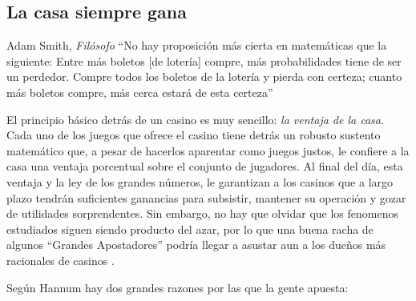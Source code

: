\subsection{La casa siempre gana}



\begin{chapquote}{Adam Smith, \textit{Filósofo} \cite{smith1963wealth}}
	``No hay proposición más cierta en matemáticas que la siguiente: Entre más boletos [de lotería] compre, más probabilidades tiene de ser un perdedor. Compre todos los boletos de la lotería y pierda con certeza; cuanto más boletos compre, más cerca estará de esta certeza''
\end{chapquote}



El principio básico detrás de un casino es muy sencillo: \emph{la ventaja de la casa}. Cada uno de los juegos que ofrece el casino tiene detrás un robusto sustento matemático que, a pesar de hacerlos aparentar como juegos justos, le confiere a la casa una ventaja porcentual sobre el conjunto de jugadores. Al final del día, esta ventaja y la ley de los grandes números, le garantizan a los casinos que a largo plazo tendrán suficientes ganancias para subsistir, mantener su operación y gozar de utilidades sorprendentes. Sin embargo, no hay que olvidar que los fenomenos estudiados siguen siendo producto del azar, por lo que una buena racha de algunos ``Grandes Apostadores'' podría llegar a asustar aun a los dueños  más racionales de casinos \cite{hannum2005practical}.



Según Hannum \cite{hannum2005practical} hay dos grandes razones por las que la gente apuesta:

